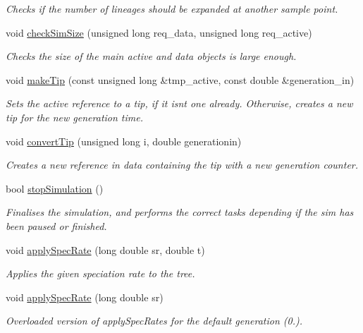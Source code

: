 \begin{DoxyCompactItemize}
\begin{DoxyCompactList}\small\item\em Checks if the number of lineages should be expanded at another sample point. \end{DoxyCompactList}\item 
void \hyperlink{class_tree_ab8a62d0ca2b1746676073e3f33e2a949}{check\+Sim\+Size} (unsigned long req\+\_\+data, unsigned long req\+\_\+active)
\begin{DoxyCompactList}\small\item\em Checks the size of the main active and data objects is large enough. \end{DoxyCompactList}\item 
void \hyperlink{class_tree_a0973cc37d9b95144db76d36cb363caca}{make\+Tip} (const unsigned long \&tmp\+\_\+active, const double \&generation\+\_\+in)
\begin{DoxyCompactList}\small\item\em Sets the active reference to a tip, if it isn\textquotesingle{}t one already. Otherwise, creates a new tip for the new generation time. \end{DoxyCompactList}\item 
void \hyperlink{class_tree_a6af2aaa691ffbb9899e3f070a715e371}{convert\+Tip} (unsigned long i, double generationin)
\begin{DoxyCompactList}\small\item\em Creates a new reference in data containing the tip with a new generation counter. \end{DoxyCompactList}\item 
bool \hyperlink{class_tree_afd6bd75c301d2f57c4997fcfc92f192e}{stop\+Simulation} ()
\begin{DoxyCompactList}\small\item\em Finalises the simulation, and performs the correct tasks depending if the sim has been paused or finished. \end{DoxyCompactList}\item 
void \hyperlink{class_tree_aa6349a32b3fcfb82a5f8311b11db3982}{apply\+Spec\+Rate} (long double sr, double t)
\begin{DoxyCompactList}\small\item\em Applies the given speciation rate to the tree. \end{DoxyCompactList}\item 
void \hyperlink{class_tree_ab699328f13b22f48faa63a5638e907db}{apply\+Spec\+Rate} (long double sr)
\begin{DoxyCompactList}\small\item\em Overloaded version of apply\+Spec\+Rates for the default generation (0.). \end{DoxyCompactList}\item 

\end{DoxyCompactItemize}
